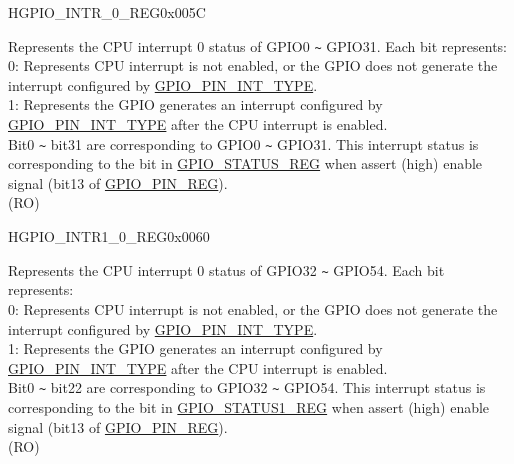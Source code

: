 \begin{register}{H}{GPIO\_INTR\_0\_REG}{0x005C}\label{regdesc:GPIOINTR0REG}
%
\regnewline%
\begin{regdesc}\begin{reglist}
\label{fielddesc:GPIOINT0}\item [GPIO\_INT\_0] Represents the CPU interrupt 0 status of GPIO0 \verb+~+ GPIO31. Each bit represents:\\
0: Represents CPU interrupt is not enabled, or the GPIO does not generate the interrupt configured by \hyperref[fielddesc:GPIOPINNINTTYPE]{GPIO\_PIN\_INT\_TYPE}.\\
1: Represents the GPIO generates an interrupt configured by \hyperref[fielddesc:GPIOPINNINTTYPE]{GPIO\_PIN\_INT\_TYPE} after the CPU interrupt is enabled.\\
Bit0 \verb+~+ bit31 are corresponding to GPIO0 \verb+~+ GPIO31. This interrupt status is corresponding to the bit in \hyperref[regdesc:GPIOSTATUSREG]{GPIO\_STATUS\_REG} when assert (high) enable signal (bit13 of \hyperref[regdesc:GPIOPINNREG]{GPIO\_PIN\_REG}). \\
(RO)
\end{reglist}\end{regdesc}
\end{register}


\begin{register}{H}{GPIO\_INTR1\_0\_REG}{0x0060}\label{regdesc:GPIOINTR10REG}
%
%
\regnewline%
\begin{regdesc}\begin{reglist}
\label{fielddesc:GPIOINT10}\item [GPIO\_INT1\_0] Represents the CPU interrupt 0 status of GPIO32 \verb+~+ GPIO54. Each bit represents:\\
0: Represents CPU interrupt is not enabled, or the GPIO does not generate the interrupt configured by \hyperref[fielddesc:GPIOPINNINTTYPE]{GPIO\_PIN\_INT\_TYPE}.\\
1: Represents the GPIO generates an interrupt configured by \hyperref[fielddesc:GPIOPINNINTTYPE]{GPIO\_PIN\_INT\_TYPE} after the CPU interrupt is enabled.\\
Bit0 \verb+~+ bit22 are corresponding to GPIO32 \verb+~+ GPIO54. This interrupt status is corresponding to the bit in \hyperref[regdesc:GPIOSTATUS1REG]{GPIO\_STATUS1\_REG} when assert (high) enable signal (bit13 of \hyperref[regdesc:GPIOPINNREG]{GPIO\_PIN\_REG}). \\
(RO)
\end{reglist}\end{regdesc}
\end{register}


